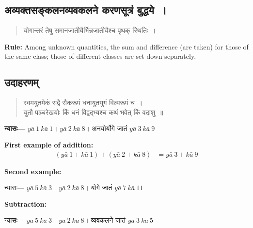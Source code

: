 \documentclass[11pt,a4paper]{article}
\newcommand{\dev}[1]{{\devanagarifont #1}}
\begin{document}
\subsection*{\dev{अव्यक्तसङ्कलनव्यवकलने करणसूत्रं बुद्धये~।}}

\begin{verse}
\devanagarifont
\centering
\color{versecolor}
\dev{योगान्तरं तेषु समानजातीयैर्भिन्नजातीयैश्च पृथक् स्थितिः~।}
\end{verse}

\textbf{Rule:} Among unknown quantities, the sum and difference (are taken) for those of the same class; those of different classes are set down separately.

\vspace{0.3cm}

\subsection*{\dev{उदाहरणम्}}

\begin{verse}
\devanagarifont
\centering
\color{versecolor}
\dev{स्वमयुतमेकं सद्वै सैकरूपं धनायुतयुगं विल्परूपं च~।}\\
\dev{युतौ पञ्चरेखयोः किं धनं विद्वद्भ्यश्च कथं भवेत् किं वदाशु~॥}
\end{verse}

\textbf{\dev{न्यासः}---} $y\bar{a}\ 1\ k\bar{a}\ 1$। $y\bar{a}\ 2\ k\bar{a}\ 8$। अनयोर्योगे जातं $y\bar{a}\ 3\ k\bar{a}\ 9$

\vspace{0.3cm}

\textbf{First example of addition:}
\begin{align*}
(y\bar{a}\ 1 + k\bar{a}\ 1) + (y\bar{a}\ 2 + k\bar{a}\ 8) &= y\bar{a}\ 3 + k\bar{a}\ 9
\end{align*}

\textbf{Second example:}

\dev{न्यासः---} $y\bar{a}\ 5\ k\bar{a}\ 3$। $y\bar{a}\ 2\ k\bar{a}\ 8$। योगे जातं $y\bar{a}\ 7\ k\bar{a}\ 11$

\textbf{Subtraction:}

\dev{न्यासः---} $y\bar{a}\ 5\ k\bar{a}\ 3$। $y\bar{a}\ 2\ k\bar{a}\ 8$। व्यवकलने जातं $y\bar{a}\ 3\ k\bar{a}\ \bar{5}$

\clearpage

\end{document}
